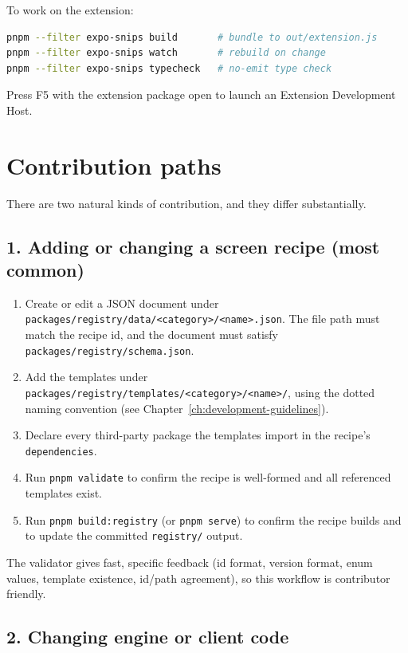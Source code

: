 To work on the extension:

\begin{lstlisting}[language=bash]
pnpm --filter expo-snips build       # bundle to out/extension.js
pnpm --filter expo-snips watch       # rebuild on change
pnpm --filter expo-snips typecheck   # no-emit type check
\end{lstlisting}

Press F5 with the extension package open to launch an Extension Development
Host.

\section{Contribution paths}

There are two natural kinds of contribution, and they differ substantially.

\subsection*{1. Adding or changing a screen recipe (most common)}

\begin{enumerate}
  \item Create or edit a JSON document under
        \texttt{packages/registry/data/<category>/<name>.json}. The file path must
        match the recipe id, and the document must satisfy
        \texttt{packages/registry/schema.json}.
  \item Add the templates under
        \texttt{packages/registry/templates/<category>/<name>/}, using the dotted
        naming convention (see Chapter~\ref{ch:development-guidelines}).
  \item Declare every third-party package the templates import in the recipe's
        \texttt{dependencies}.
  \item Run \texttt{pnpm validate} to confirm the recipe is well-formed and all
        referenced templates exist.
  \item Run \texttt{pnpm build:registry} (or \texttt{pnpm serve}) to confirm the
        recipe builds and to update the committed \texttt{registry/} output.
\end{enumerate}

The validator gives fast, specific feedback (id format, version format, enum
values, template existence, id/path agreement), so this workflow is contributor
friendly.

\subsection*{2. Changing engine or client code}

